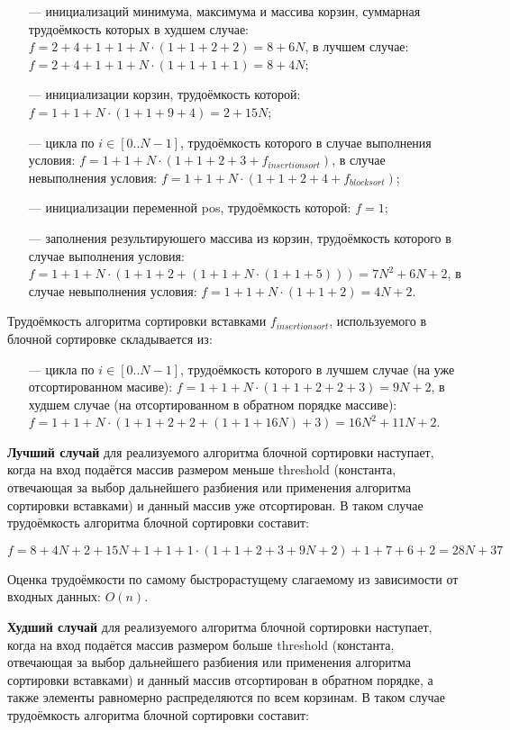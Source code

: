 \begin{itemize}
	\item[---] инициализаций минимума, максимума и массива корзин, суммарная трудоёмкость которых в худшем случае: $f = 2 + 4 + 1 + 1 + N \cdot (1 + 1 + 2 + 2) = 8 + 6N$, в лучшем случае: $f = 2 + 4 + 1 + 1 + N \cdot (1 + 1 + 1 + 1) = 8 + 4N$;
	\item[---] инициализации корзин, трудоёмкость которой: $f = 1 + 1 + N \cdot (1 + 1 + 9 + 4) = 2 + 15N$;
	\item[---] цикла по $i \in [0..N-1]$, трудоёмкость которого в случае выполнения условия: $f = 1 + 1 + N \cdot (1 + 1 + 2 + 3 + f_{insertionsort})$, в случае невыполнения условия: $f = 1 + 1 + N \cdot (1 + 1 + 2 + 4 + f_{blocksort})$;
	\item[---] инициализации переменной pos, трудоёмкость которой: $f = 1$;
	\item[---] заполнения результируюшего массива из корзин, трудоёмкость которого в случае выполнения условия: $f = 1 + 1 + N \cdot (1 + 1 + 2 + (1 + 1 + N \cdot (1 + 1 + 5))) = 7N^2 + 6N + 2$, в случае невыполнения условия: $f = 1 + 1 + N \cdot (1 + 1 + 2) = 4N + 2$.
\end{itemize}

Трудоёмкость алгоритма сортировки вставками $ f_{insertionsort}$, используемого в блочной сортировке складывается из:

\begin{itemize}
	\item[---] цикла по $i \in [0..N-1]$, трудоёмкость которого в лучшем случае (на уже отсортированном масиве): $f = 1 + 1 + N \cdot (1 + 1 + 2 + 2 + 3) = 9N + 2$, в худшем случае (на отсортированном в обратном порядке массиве): $f = 1 + 1 + N \cdot (1 + 1 + 2 + 2 + (1 + 1 + 16N) + 3) = 16N^2 + 11N + 2$.
\end{itemize}

\textbf{Лучший случай} для реализуемого алгоритма блочной сортировки наступает, когда на вход подаётся массив размером меньше threshold (константа, отвечающая за выбор дальнейшего разбиения или применения алгоритма сортировки вставками) и данный массив уже отсортирован. 
В таком случае трудоёмкость алгоритма блочной сортировки составит:

$f = 8 + 4N + 2 + 15N + 1 + 1 + 1 \cdot (1 + 1 + 2 + 3 + 9N + 2) + 1 + 7 + 6 + 2 = 28N + 37$

Оценка трудоёмкости по самому быстрорастущему слагаемому из зависимости от входных данных: $O(n)$.

\textbf{Худший случай} для реализуемого алгоритма блочной сортировки наступает, когда на вход подаётся массив размером больше threshold (константа, отвечающая за выбор дальнейшего разбиения или применения алгоритма сортировки вставками) и данный массив отсортирован в обратном порядке, а также элементы равномерно распределяются по всем корзинам. 
В таком случае трудоёмкость алгоритма блочной сортировки составит:

